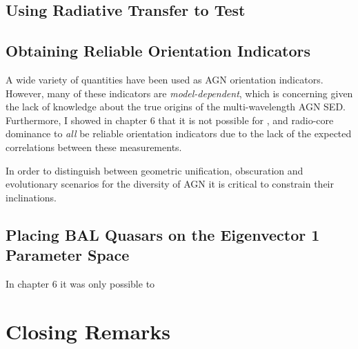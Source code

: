 \subsection{Using Radiative Transfer to Test }

\subsection{Obtaining Reliable Orientation Indicators}

A wide variety of quantities have been used as AGN orientation
indicators. However, many of these indicators are {\em model-dependent},
which is concerning given the lack of knowledge about the true
origins of the multi-wavelength AGN SED. Furthermore, I showed in
chapter 6 that it is not possible for \ewo, \fwh and radio-core 
dominance to {\em all} be reliable orientation indicators due to
the lack of the expected correlations between these measurements.

In order to distinguish between geometric unification, obscuration 
and evolutionary scenarios for the diversity of AGN it is 
critical to constrain their inclinations.


\subsection{Placing BAL Quasars on the Eigenvector 1 Parameter Space}

In chapter 6 it was only possible to 


\section{Closing Remarks}

